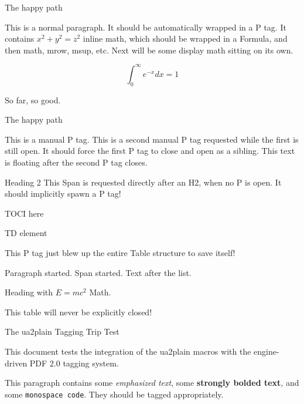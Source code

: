 \relax
{}


The happy path
\tagstructend

This is a normal paragraph. It should be automatically wrapped in a P tag.
It contains $x^2 + y^2 = z^2$ inline math, which should be wrapped in a Formula, and then math, mrow, msup, etc. Next will be some display math sitting on its own.

$$ \int_0^\infty e^{-x} dx = 1 $$

So far, so good.

The happy path
\tagstructend

This is a manual P tag.
This is a second manual P tag requested while the first is still open. 
It should force the first P tag to close and open as a sibling.
\tagstructend
This text is floating after the second P tag closes.

Heading 2
\tagstructend
{}
This Span is requested directly after an H2, when no P is open. It should implicitly spawn a P tag!
\tagstructend

TOCI here
\tagstructend
\tagstructend

TD element
\tagstructend

This P tag just blew up the entire Table structure to save itself!
\tagstructend

Paragraph started.
Span started.
\tagstructend
Text after the list.

Heading with $E=mc^2$ Math.
\tagstructend

This table will never be explicitly closed!


\beginsection The ua2plain Tagging Trip Test

This document tests the integration of the ua2plain macros with the engine-driven PDF 2.0 tagging system.

This paragraph contains some \emph{emphasized text}, some \textbf{strongly bolded text}, and some \texttt{monospace code}. They should be tagged appropriately.

